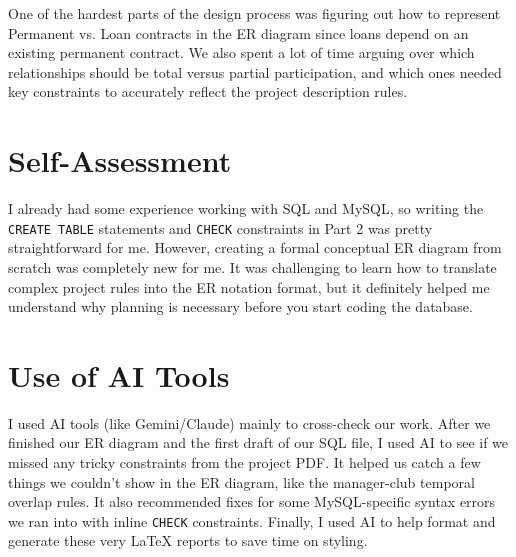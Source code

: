\documentclass[12pt, a4paper]{article}
\begin{document}
One of the hardest parts of the design process was figuring out how to represent Permanent vs. Loan contracts in the ER diagram since loans depend on an existing permanent contract. We also spent a lot of time arguing over which relationships should be total versus partial participation, and which ones needed key constraints to accurately reflect the project description rules.

\section*{Self-Assessment}
I already had some experience working with SQL and MySQL, so writing the \texttt{CREATE TABLE} statements and \texttt{CHECK} constraints in Part 2 was pretty straightforward for me. However, creating a formal conceptual ER diagram from scratch was completely new for me. It was challenging to learn how to translate complex project rules into the  ER notation format, but it definitely helped me understand why planning is necessary before you start coding the database.

\section*{Use of AI Tools}
I used AI tools (like Gemini/Claude) mainly to cross-check our work. After we finished our ER diagram and the first draft of our SQL file, I used AI to see if we missed any tricky constraints from the project PDF. It helped us catch a few things we couldn't show in the ER diagram, like the manager-club temporal overlap rules. It also recommended fixes for some MySQL-specific syntax errors we ran into with inline \texttt{CHECK} constraints. Finally, I used AI to help format and generate these very LaTeX reports to save time on styling.
\end{document}

